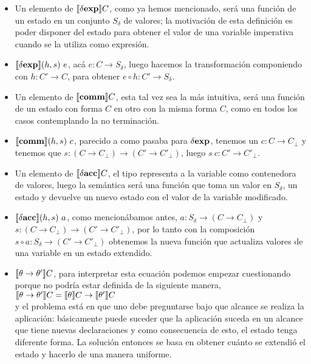 \begin{itemize}
\item Un elemento de $\llbracket \delta \textbf{exp} \rrbracket C$, como ya hemos mencionado, ser\'a una funci\'on 
de un estado en un conjunto $S_\delta$ de valores; la motivaci\'on de 
esta definici\'on es poder disponer del estado para obtener el valor de 
una variable imperativa cuando se la utiliza como expresi\'on.

\item $\llbracket \delta \textbf{exp} \rrbracket(h,s) \ e$, acá $e : C \rightarrow S_\delta$, luego
hacemos la transformaci\'on componiendo con $h : C' \rightarrow C$, para obtener
$e \circ h : C' \rightarrow S_\delta$.

\item Un elemento de $\llbracket \textbf{comm} \rrbracket C$, esta tal vez sea la m\'as intuitiva, ser\'a
una funci\'on de un estado con forma $C$ en otro con la misma forma $C$,
como en todos los casos contemplando la no terminaci\'on.

\item $\llbracket \textbf{comm} \rrbracket(h,s) \ c$, parecido a como pasaba para $\delta \textbf{exp}$,
tenemos un $c : C \rightarrow C_\bot$ y tenemos que 
$s : (C \rightarrow C_\bot) \rightarrow (C' \rightarrow C'_\bot)$, luego
$s \ c : C' \rightarrow C'_\bot$.

\item Un elemento de $\llbracket \delta \textbf{acc} \rrbracket C$, el tipo representa a la variable como contenedora
de valores, luego la sem\'antica ser\'a una funci\'on que toma un valor en $S_\delta$,
un estado y devuelve un nuevo estado con el valor de la variable modificado.

\item $\llbracket \delta \textbf{acc} \rrbracket(h,s) \ a$, como mencion\'abamos antes, 
$a : S_\delta \rightarrow (C \rightarrow C_\bot)$ y
$s : (C \rightarrow C_\bot) \rightarrow (C' \rightarrow C'_\bot)$, por lo tanto
con la composici\'on $s \circ a : S_\delta \rightarrow (C' \rightarrow C'_\bot)$
obtenemos la nueva funci\'on que actualiza valores de una variable en un estado
extendido.

\item $\llbracket \theta \rightarrow \theta' \rrbracket C$, para interpretar esta ecuaci\'on
podemos empezar cuestionando porque no podr\'ia estar definida de la siguiente 
manera,\\

$\llbracket \theta \rightarrow \theta' \rrbracket C = \llbracket \theta \rrbracket C \rightarrow \llbracket \theta' \rrbracket C$\\

y el problema est\'a en que uno debe preguntarse bajo que alcance se realiza la aplicaci\'on:
b\'asicamente puede suceder que la aplicaci\'on suceda en un alcance
que tiene nuevas declaraciones y como consecuencia de esto, el estado tenga diferente
forma. La soluci\'on entonces se basa en obtener cu\'anto se extendió el estado y 
hacerlo de una manera uniforme.


\end{itemize}
